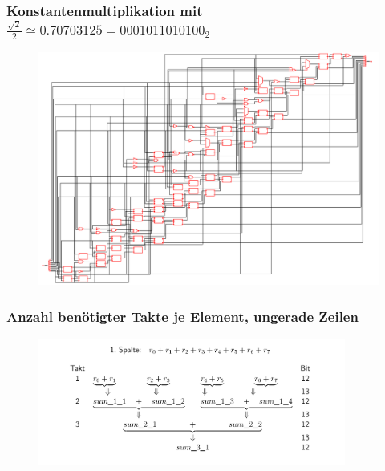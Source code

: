 \begin{frame}\frametitle{Konstantenmultiplikation mit $\frac{\sqrt{2}}{2} \simeq 0.70703125 = 0001011010100_2$}
 \begin{figure}[!ht]
\centering  
  \includegraphics[width=1\textwidth]{img/13Bit_Konstantenmultiplizierer_neu.png}
  \label{pic:Konstantenmultiplizierer}
\end{figure}
\end{frame}


\begin{frame}\frametitle{Anzahl benötigter Takte je Element, ungerade Zeilen}
 \begin{figure}
  \centering
  \includegraphics[width=0.9\textwidth]{img/ungeradeZeilen.png}
 \end{figure}
\end{frame}



